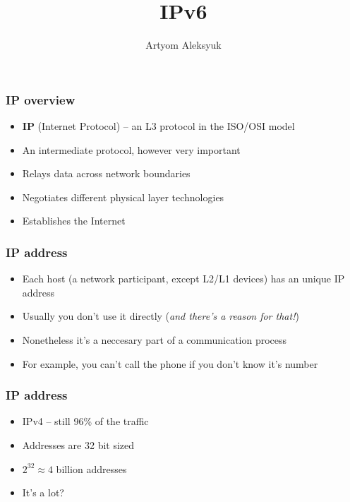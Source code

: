 \documentclass[12pt,leqno,fleqn]{beamer}
\author{Artyom Aleksyuk}
\title{IPv6}
\institute{KSPT ICC SPbSTU}
\begin{document}
\maketitle

\setlength{\TPHorizModule}{1cm} %
\setlength{\TPVertModule}{1cm} %


\begin{frame}
\frametitle{IP overview}
\begin{itemize}
\item \textbf{IP} (Internet Protocol) – an L3 protocol in the ISO/OSI model
\item An intermediate protocol, however very important
\item Relays data across network boundaries
\item Negotiates different physical layer technologies
\item Establishes the Internet
\end{itemize}
\end{frame}


\begin{frame}
\frametitle{IP address}
\begin{itemize}
\item Each host (a network participant, except L2/L1 devices) has an unique IP address
\item Usually you don’t use it directly (\textit{and there’s a reason for that!})
\item Nonetheless it's a neccesary part of a communication process
\item For example, you can’t call the phone if you don’t know it’s number
\end{itemize}
\end{frame}


\begin{frame}
\frametitle{IP address}
\begin{itemize}
\item IPv4 – still 96\% of the traffic
\item Addresses are 32 bit sized
\item $2^{32} \approx 4$ billion addresses
\item It’s a lot?
\end{itemize}
\end{frame}
\end{document}
